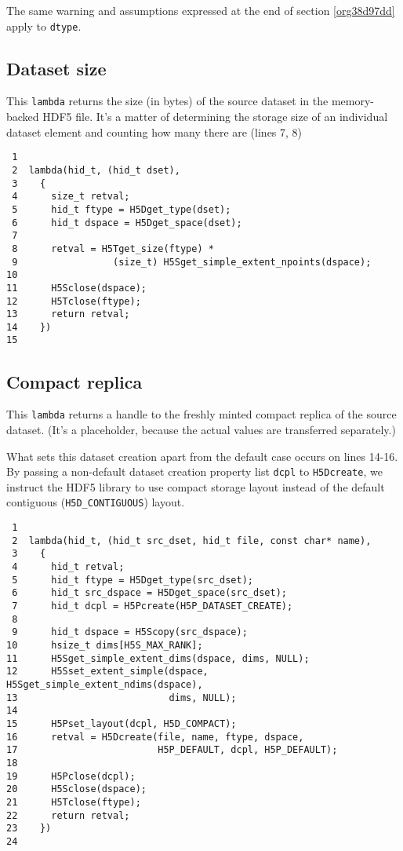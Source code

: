 \documentclass[a4paper, 12pt]{article}
\begin{document}
The same warning and assumptions expressed at the end of section
\ref{org38d97dd} apply to \texttt{dtype}.

\subsection{Dataset size \label{orge27ca63}}
\label{sec:org8516942}

This \texttt{lambda} returns the size (in bytes) of the source dataset in the
memory-backed HDF5 file. It's a matter of determining the storage size
of an individual dataset element and counting how many there are
(lines 7, 8)

\begin{verbatim}
 1
 2  lambda(hid_t, (hid_t dset),
 3    {
 4      size_t retval;
 5      hid_t ftype = H5Dget_type(dset);
 6      hid_t dspace = H5Dget_space(dset);
 7
 8      retval = H5Tget_size(ftype) *
 9                 (size_t) H5Sget_simple_extent_npoints(dspace);
10
11      H5Sclose(dspace);
12      H5Tclose(ftype);
13      return retval;
14    })
15
\end{verbatim}

\subsection{Compact replica \label{org563ffcf}}
\label{sec:org1a60af2}

This \texttt{lambda} returns a handle to the freshly minted compact replica of
the source dataset. (It's a placeholder, because the actual values are
transferred separately.)

What sets this dataset creation apart from the default case occurs on lines
14-16. By passing a non-default dataset creation
property list \texttt{dcpl} to \texttt{H5Dcreate}, we instruct the HDF5 library to use compact
storage layout instead of the default contiguous (\texttt{H5D\_CONTIGUOUS}) layout.

\begin{verbatim}
 1
 2  lambda(hid_t, (hid_t src_dset, hid_t file, const char* name),
 3    {
 4      hid_t retval;
 5      hid_t ftype = H5Dget_type(src_dset);
 6      hid_t src_dspace = H5Dget_space(src_dset);
 7      hid_t dcpl = H5Pcreate(H5P_DATASET_CREATE);
 8
 9      hid_t dspace = H5Scopy(src_dspace);
10      hsize_t dims[H5S_MAX_RANK];
11      H5Sget_simple_extent_dims(dspace, dims, NULL);
12      H5Sset_extent_simple(dspace, H5Sget_simple_extent_ndims(dspace),
13                           dims, NULL);
14
15      H5Pset_layout(dcpl, H5D_COMPACT);
16      retval = H5Dcreate(file, name, ftype, dspace,
17                         H5P_DEFAULT, dcpl, H5P_DEFAULT);
18
19      H5Pclose(dcpl);
20      H5Sclose(dspace);
21      H5Tclose(ftype);
22      return retval;
23    })
24
\end{verbatim}
\end{document}
